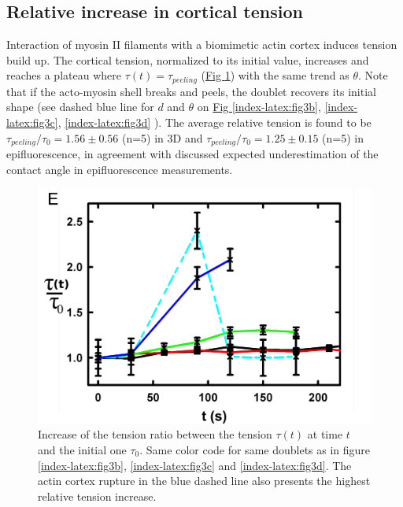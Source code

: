 \documentclass[A4paperpaper,11pt,english]{sphinxmanual}
\begin{document}
\subsection{Relative increase in cortical tension}
\label{index-latex:relative-increase-in-cortical-tension}
Interaction of myosin II filaments with a biomimetic actin cortex induces
tension build up. The cortical tension, normalized to its initial value,
increases and reaches a plateau where \(\tau(t) = \tau_{peeling}\)
(\hyperref[index-latex:fig3e]{Fig  \ref*{index-latex:fig3e}}) with the same trend as \(\theta\).  Note that if the acto-myosin shell
breaks and peels, the doublet recovers its initial shape (see dashed blue line
for \(d\) and \(\theta\) on  \hyperref[index-latex:fig3b]{Fig  \ref*{index-latex:fig3b}}, \hyperref[index-latex:fig3c]{ \ref*{index-latex:fig3c}}, \hyperref[index-latex:fig3d]{ \ref*{index-latex:fig3d}} ). The average relative tension is found to
be \(\tau_{peeling}/\tau_0 = 1.56 \pm 0.56\) (n=5) in 3D and
\(\tau_{peeling}/\tau_0  = 1.25 \pm 0.15\) (n=5) in epifluorescence, in
agreement with discussed expected underestimation of the contact angle in epifluorescence measurements.
\begin{figure}[htbp]
\centering
\capstart

\includegraphics[width=0.500\linewidth]{Fig_03-E.png}
\caption{Increase of the tension ratio between the tension \(\tau(t)\) at time
\(t\) and the initial one \(\tau_0\).
Same color code for same doublets as in figure \hyperref[index-latex:fig3b]{ \ref*{index-latex:fig3b}}, \hyperref[index-latex:fig3c]{ \ref*{index-latex:fig3c}}
and \hyperref[index-latex:fig3d]{ \ref*{index-latex:fig3d}}. The actin cortex rupture in the blue dashed line also presents the highest relative tension increase.}\label{index-latex:fig3e}\end{figure}
\end{document}
